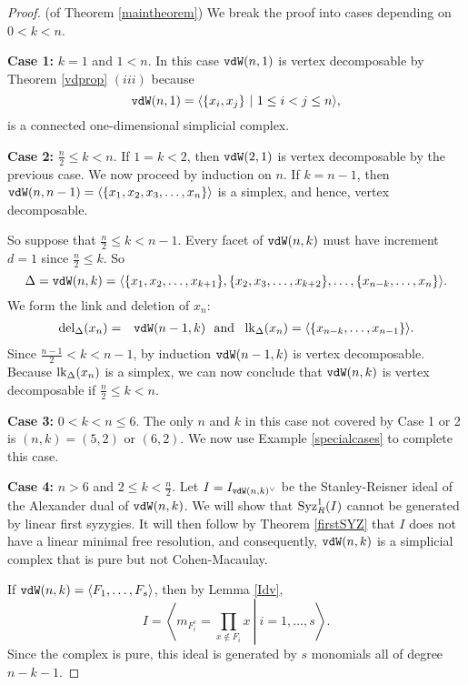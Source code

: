 \documentclass[12pt]{amsart}
\numberwithin{equation}{section}
\theoremstyle{definition}
\begin{document}
\begin{proof}{(of Theorem \ref{maintheorem})}
We break the proof into cases depending on $0 < k < n$.  


{\bf Case 1:} $k=1$ and $1 <n$. In this case  ${\tt vdW}(n,1)$ is vertex decomposable
by Theorem \ref{vdprop} $(iii)$ because 
\[{\tt vdW}(n,1) = \langle \{x_i,x_j\} ~|~ 1 \leq i < j \leq n \rangle,\]
is a connected one-dimensional simplicial complex.


{\bf Case 2:} $\frac{n}{2} \leq k < n$.
If $1 = k < 2$, then
${\tt vdW}(2,1)$ is vertex decomposable by the previous case.
We now proceed by induction on $n$.  If $k = n-1$, then
${\tt vdW}(n,n-1) = \langle \{x_1,x_2,x_3,\ldots,x_n\} \rangle$ is a
simplex, and hence, vertex decomposable.  

So suppose that  $\frac{n}{2} \leq k < n-1$.
Every facet of  ${\tt vdW}(n,k)$ must have increment $d=1$
since $\frac{n}{2} \leq k$.  So
\[\Delta = {\tt vdW}(n,k) = \langle \{x_1,x_2,\ldots,x_{k+1}\},
\{x_2,x_3,\ldots,x_{k+2}\},
\ldots,\{x_{n-k},\ldots,x_n\} \rangle.\]
We form the link and deletion of $x_n$:
\begin{eqnarray*}
\operatorname{del}_\Delta(x_n) & = & {\tt vdW}(n-1,k) ~~\mbox{and}~~
\operatorname{lk}_\Delta(x_n) =  \langle \{x_{n-k},\ldots,x_{n-1}\}\rangle.
\end{eqnarray*}
Since $\frac{n-1}{2} < k < n-1$, by induction ${\tt vdW}(n-1,k)$ 
is vertex decomposable.  Because $\operatorname{lk}_\Delta(x_n)$ is a simplex,
we can now conclude that ${\tt vdW}(n,k)$ is vertex decomposable
if $\frac{n}{2} \leq k < n$.

{\bf Case 3:} $0 < k < n \leq 6$.
The only $n$ and $k$ in this case not covered by Case 1 or 2 is
$(n,k) = (5,2)$ or $(6,2)$.  We now use Example \ref{specialcases}
to complete this case.

{\bf Case 4:} $n > 6$ and $2 \leq k < \frac{n}{2}$. 
Let $I = I_{{\tt vdW}(n,k)^\vee}$ be the Stanley-Reisner ideal of the 
Alexander dual of ${\tt vdW}(n,k)$.  We will show that 
${\rm Syz}_R^1(I)$ cannot be generated by linear first syzygies.
It will then follow by Theorem \ref{firstSYZ} that $I$ does
not have a linear minimal free resolution, and consequently,
${\tt vdW}(n,k)$ is a  simplicial complex that is pure but
not Cohen-Macaulay.


If ${\tt vdW}(n,k) = \langle F_1,\ldots,F_s \rangle$, then
by Lemma \ref{Idv}, 
\[I = \left.\left\langle m_{F_i^c} = \prod_{x \not\in F_i} x ~\right|~ i=1,\ldots,s 
\right\rangle.\]
Since the complex is pure, this ideal is generated by $s$
monomials all of degree $n - k -1$.


\end{proof}
\end{document}
